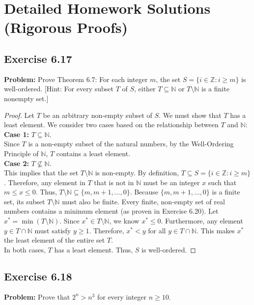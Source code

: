 \documentclass[11pt, a4paper]{article}
\theoremstyle{definition}
\theoremstyle{remark}
\newcommand{\N}{\mathbb{N}}
\newcommand{\Z}{\mathbb{Z}}
\begin{document}
\newpage

\section{Detailed Homework Solutions (Rigorous Proofs)}

\subsection{Exercise 6.17}
\textbf{Problem:} Prove Theorem 6.7: For each integer $m$, the set $S = \{i \in \Z : i \ge m\}$ is well-ordered. [Hint: For every subset $T$ of $S$, either $T \subseteq \N$ or $T \setminus \N$ is a finite nonempty set.]

\begin{proof}
Let $T$ be an arbitrary non-empty subset of $S$. We must show that $T$ has a least element. We consider two cases based on the relationship between $T$ and $\N$:
\vspace{4pt} \\
\textbf{Case 1:} $T \subseteq \N$. \\
Since $T$ is a non-empty subset of the natural numbers, by the Well-Ordering Principle of $\N$, $T$ contains a least element.
\vspace{4pt} \\
\textbf{Case 2:} $T \not\subseteq \N$. \\
This implies that the set $T \setminus \N$ is non-empty. By definition, $T \subseteq S = \{i \in \Z : i \ge m\}$. Therefore, any element in $T$ that is not in $\N$ must be an integer $x$ such that $m \le x \le 0$. Thus, $T \setminus \N \subseteq \{m, m+1, \dots, 0\}$. 
Because $\{m, m+1, \dots, 0\}$ is a finite set, its subset $T \setminus \N$ must also be finite. Every finite, non-empty set of real numbers contains a minimum element (as proven in Exercise 6.20). Let $x^* = \min(T \setminus \N)$. 
Since $x^* \in T \setminus \N$, we know $x^* \le 0$. Furthermore, any element $y \in T \cap \N$ must satisfy $y \ge 1$. Therefore, $x^* < y$ for all $y \in T \cap \N$. This makes $x^*$ the least element of the entire set $T$.
\vspace{4pt} \\
In both cases, $T$ has a least element. Thus, $S$ is well-ordered.
\end{proof}

\subsection{Exercise 6.18}
\textbf{Problem:} Prove that $2^n > n^3$ for every integer $n \ge 10$.
\end{document}
